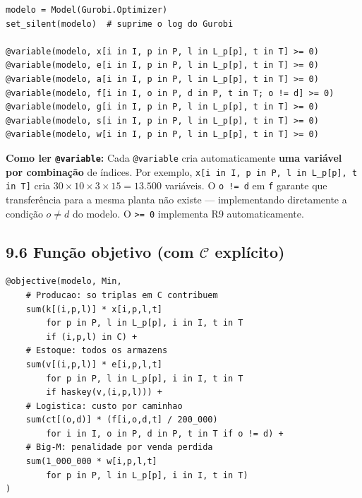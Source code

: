 \documentclass[12pt, a4paper]{article}
\begin{document}
\begin{mdframed}[style=codigo]
\begin{lstlisting}
modelo = Model(Gurobi.Optimizer)
set_silent(modelo)  # suprime o log do Gurobi

@variable(modelo, x[i in I, p in P, l in L_p[p], t in T] >= 0)
@variable(modelo, e[i in I, p in P, l in L_p[p], t in T] >= 0)
@variable(modelo, a[i in I, p in P, l in L_p[p], t in T] >= 0)
@variable(modelo, f[i in I, o in P, d in P, t in T; o != d] >= 0)
@variable(modelo, g[i in I, p in P, l in L_p[p], t in T] >= 0)
@variable(modelo, s[i in I, p in P, l in L_p[p], t in T] >= 0)
@variable(modelo, w[i in I, p in P, l in L_p[p], t in T] >= 0)
\end{lstlisting}
\end{mdframed}

\begin{mdframed}[style=destaque]
\textbf{\color{ballblue}Como ler \texttt{@variable}:}
Cada \texttt{@variable} cria automaticamente \textbf{uma vari\'{a}vel por combina\c{c}\~{a}o}
de \'{i}ndices. Por exemplo, \texttt{x[i in I, p in P, l in L\_p[p], t in T]}
cria $30 \times 10 \times 3 \times 15 = 13.500$ vari\'{a}veis.
O \texttt{o != d} em \texttt{f} garante que transferência para a mesma planta n\~{a}o existe ---
implementando diretamente a condi\c{c}\~{a}o $o \neq d$ do modelo.
O \texttt{>= 0} implementa R9 automaticamente.
\end{mdframed}

\subsection*{9.6 Fun\c{c}\~{a}o objetivo (com $\mathcal{C}$ expl\'{i}cito)}

\begin{mdframed}[style=codigo]
\begin{lstlisting}
@objective(modelo, Min,
    # Producao: so triplas em C contribuem
    sum(k[(i,p,l)] * x[i,p,l,t]
        for p in P, l in L_p[p], i in I, t in T
        if (i,p,l) in C) +
    # Estoque: todos os armazens
    sum(v[(i,p,l)] * e[i,p,l,t]
        for p in P, l in L_p[p], i in I, t in T
        if haskey(v,(i,p,l))) +
    # Logistica: custo por caminhao
    sum(ct[(o,d)] * (f[i,o,d,t] / 200_000)
        for i in I, o in P, d in P, t in T if o != d) +
    # Big-M: penalidade por venda perdida
    sum(1_000_000 * w[i,p,l,t]
        for p in P, l in L_p[p], i in I, t in T)
)
\end{lstlisting}
\end{mdframed}
\end{document}
